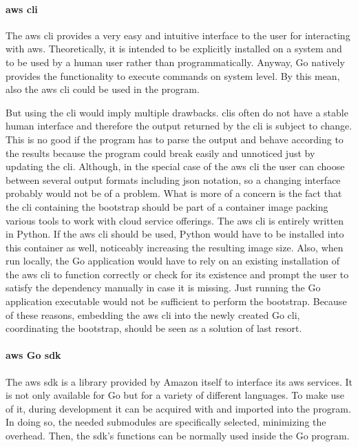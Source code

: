 \paragraph{\ac{aws} \ac{cli}}
The \ac{aws} \ac{cli} provides a very easy and intuitive interface to the user for interacting with \ac{aws}.
Theoretically, it is intended to be explicitly installed on a system and to be used by a human user rather than programmatically.
Anyway, Go natively provides the functionality to execute commands on system level.
By this mean, also the \ac{aws} \ac{cli} could be used in the program.

But using the \ac{cli} would imply multiple drawbacks.
\acp{cli} often do not have a stable human interface and therefore the output returned by the \ac{cli} is subject to change.
This is no good if the program has to parse the output and behave according to the results because the program could break easily and unnoticed just by updating the \ac{cli}.
Although, in the special case of the \ac{aws} \ac{cli} the user can choose between several output formats including \ac{json} notation, so a changing interface probably would not be of a problem.
What is more of a concern is the fact that the \ac{cli} containing the bootstrap should be part of a container image packing various tools to work with cloud service offerings.
The \ac{aws} \ac{cli} is entirely written in Python.
If the \ac{aws} \ac{cli} should be used, Python would have to be installed into this container as well, noticeably increasing the resulting image size.
Also, when run locally, the Go application would have to rely on an existing installation of the \ac{aws} \ac{cli} to function correctly or check for its existence and prompt the user to satisfy the dependency manually in case it is missing.
Just running the Go application executable would not be sufficient to perform the bootstrap.
Because of these reasons, embedding the \ac{aws} \ac{cli} into the newly created Go \ac{cli}, coordinating the bootstrap, should be seen as a solution of last resort.

\paragraph{\ac{aws} Go \acs*{sdk}}
The \ac{aws} \ac{sdk} is a library provided by Amazon itself to interface its \ac{aws} services.
It is not only available for Go but for a variety of different languages.
To make use of it, during development it can be acquired with  and imported into the program.
In doing so, the needed submodules are specifically selected, minimizing the overhead.
Then, the \ac{sdk}'s functions can be normally used inside the Go program.

